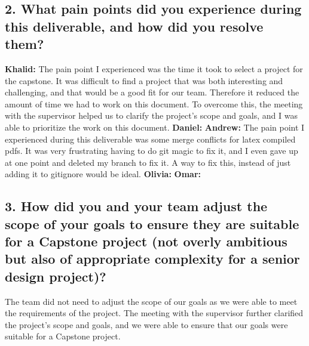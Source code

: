 \documentclass{article}
\begin{document}
\subsection*{2. What pain points did you experience during this deliverable, and how did you resolve them?}
\bigskip
\textbf{Khalid:} The pain point I experienced was the time it took to select a project for the capstone. It was difficult to find a project that was both interesting and challenging, and that would be a good fit for our team. Therefore it reduced the amount of time we had to work on this document. To overcome this, the meeting with the supervisor helped us to clarify the project's scope and goals, and I was able to prioritize the work on this document.
\newline
\newline
\textbf{Daniel:}
\newline
\newline
\textbf{Andrew:} The pain point I experienced during this deliverable was some merge conflicts for latex compiled pdfs. It was very frustrating having to do git magic to fix it, and I even gave up at one point and deleted my branch to fix it. A way to fix this, instead of just adding it to gitignore would be ideal. 
\newline
\newline
\textbf{Olivia:}
\newline
\newline
\textbf{Omar:}


\subsection*{3. How did you and your team adjust the scope of your goals to ensure they are suitable for a Capstone project (not overly ambitious but also of appropriate complexity for a senior design project)?}
The team did not need to adjust the scope of our goals as we were able to meet the requirements of the project. The meeting with the supervisor further clarified the project's scope and goals, and we were able to ensure that our goals were suitable for a Capstone project.
\end{document}
